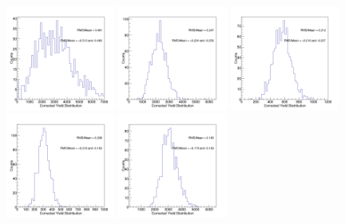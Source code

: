 \begin{figure}[h]
\begin{center}
\includegraphics[width= 0.32\textwidth]{Figures/Chapter4/BsCorrYield_0_90_7-10_Assym.png}
\includegraphics[width= 0.32\textwidth]{Figures/Chapter4/BsCorrYield_0_90_10-15_Assym.png}
\includegraphics[width= 0.32\textwidth]{Figures/Chapter4/BsCorrYield_0_90_15-20_Assym.png}
\includegraphics[width= 0.32\textwidth]{Figures/Chapter4/BsCorrYield_0_90_20-50_Assym.png}
\includegraphics[width= 0.32\textwidth]{Figures/Chapter4/BsCorrYield_0_90_10-50_Assym.png}

\end{center}
\end{figure}
